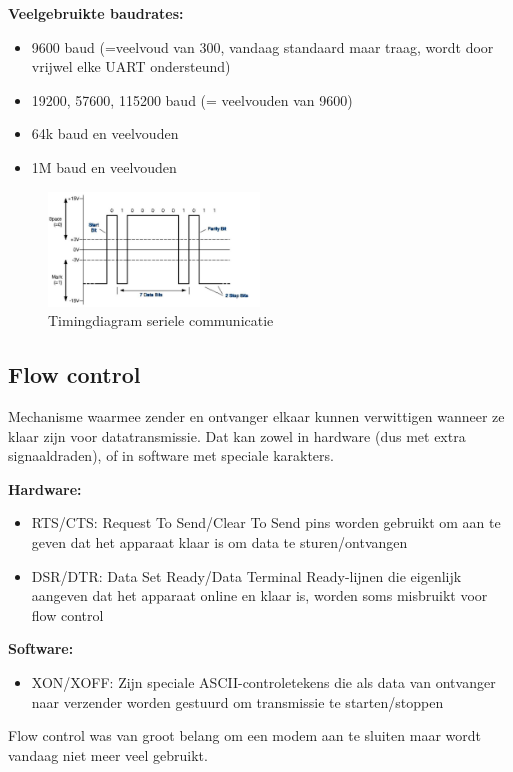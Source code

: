 \documentclass{article}
\newcommand{\bold}[1]{\textbf{#1}}
\begin{document}
\bold{Veelgebruikte baudrates:}
\begin{itemize}
    \item 9600 baud (=veelvoud van 300, vandaag standaard maar traag, wordt door vrijwel elke UART ondersteund)
    \item 19200, 57600, 115200 baud (= veelvouden van 9600)
    \item 64k baud en veelvouden
    \item 1M baud en veelvouden
\end{itemize}

\begin{figure}[H]
    \centering
    \includegraphics[width=0.5\textwidth]{serielecommunicatie.png}
    \caption{Timingdiagram seriele communicatie}
\end{figure}

\subsection{Flow control}
Mechanisme waarmee zender en ontvanger elkaar kunnen verwittigen wanneer ze klaar zijn voor datatransmissie. 
Dat kan zowel in hardware (dus met extra signaaldraden), of in software met speciale karakters.

\bold{Hardware:}
\begin{itemize}
    \item RTS/CTS: Request To Send/Clear To Send pins worden gebruikt om aan te geven dat het apparaat klaar is om data te sturen/ontvangen
    \item DSR/DTR: Data Set Ready/Data Terminal Ready-lijnen die eigenlijk aangeven dat het apparaat online en klaar is, worden soms misbruikt voor flow control
\end{itemize}

\bold{Software:}
\begin{itemize}
    \item XON/XOFF: Zijn speciale ASCII-controletekens die als data van ontvanger naar verzender worden gestuurd om transmissie te starten/stoppen
\end{itemize}

Flow control was van groot belang om een modem aan te sluiten maar wordt vandaag niet meer veel gebruikt.
\end{document}
